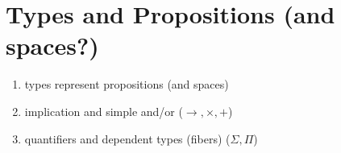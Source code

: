 \section{Types and Propositions (and spaces?)}
\begin{enumerate}
  \item types represent propositions (and spaces)
  \item implication and simple and/or ($\rightarrow, \times, +$)
  \item quantifiers and dependent types (fibers) ($\Sigma, \Pi$)
\end{enumerate}